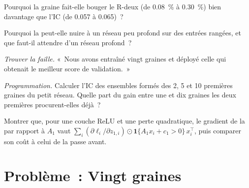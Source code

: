 \begin{exercise}[$\star\star$]\label{exo:ml:neural-networks-for-noisy-tabular-data:4}
Pourquoi la graine fait-elle bouger le R-deux (de 0.08~\% à 0.30~\%) bien davantage que l'IC (de 0.057 à 0.065)~?
\end{exercise}

\begin{exercise}[$\star\star$]\label{exo:ml:neural-networks-for-noisy-tabular-data:5}
Pourquoi la  peut-elle nuire à un réseau peu profond sur des entrées rangées, et que faut-il attendre d'un réseau profond~?
\end{exercise}

\begin{exercise}[$\star\star$]\label{exo:ml:neural-networks-for-noisy-tabular-data:6}
\emph{Trouver la faille.} «~Nous avons entraîné vingt graines et déployé celle qui obtenait le meilleur score de validation.~»
\end{exercise}

\begin{exercise}[$\star\star\star$]\label{exo:ml:neural-networks-for-noisy-tabular-data:7}
\emph{Programmation.} Calculer l'IC des ensembles formés des 2, 5 et 10 premières graines du petit réseau. Quelle part du gain entre
une et dix graines les deux premières procurent-elles déjà~?
\end{exercise}

\begin{exercise}[$\star\star\star$]\label{exo:ml:neural-networks-for-noisy-tabular-data:8}
Montrer que, pour une couche ReLU et une perte quadratique, le gradient de la  par rapport à $A_1$ vaut $\sum_i
(\partial\ell_i/\partial z_{1,i})\odot\mathbf 1\{A_1x_i + c_1 > 0\}\,x_i^\top$, puis comparer son coût à celui de la
passe avant.
\end{exercise}

\section{Problème~: Vingt graines}

